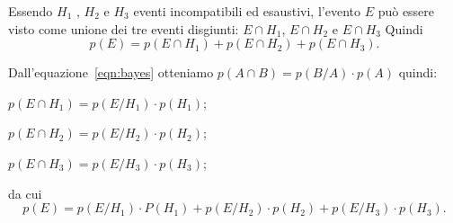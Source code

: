 \begin{exrig}
\begin{esempio}
Essendo $ H_1 $ , $ H_2 $ e $ H_3 $ eventi incompatibili ed esaustivi, l'evento $ E $ può
essere visto come unione dei tre eventi disgiunti:  $E\cap H_{1}$, $E\cap H_{2}$ e $E\cap H_{3}$ 
Quindi\[p(E)=p(E\cap H_{1})+p(E\cap H_{2})+p(E\cap H_{3}).\]

Dall'equazione~\eqref{eqn:bayes} otteniamo $ p(A\cap B)=p(B/A)\cdot{p(A)} $ quindi:
\begin{description*}
 \item $p(E\cap H_{1})=p(E/H_{1})\cdot p(H_{1})$;
 \item $p(E\cap H_{2})=p(E/H_{2})\cdot p(H_{2})$;
 \item $p(E\cap H_{3})=p(E/H_{3})\cdot p(H_{3})$;
\end{description*}
da cui
\[p(E)=p(E/H_{1})\cdot P(H_{1})+p(E/H_{2})\cdot p(H_{2})+p(E/H_{3})\cdot p(H_{3}).\]
\end{esempio}
\end{exrig}

